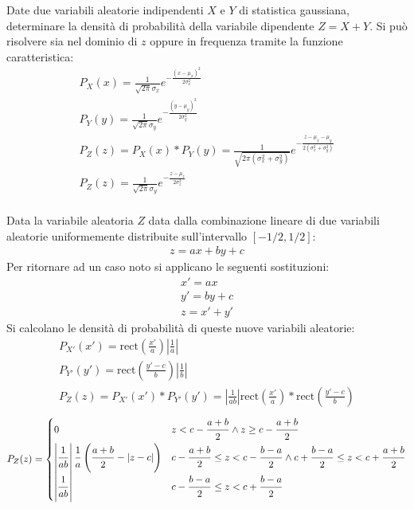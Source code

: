 \documentclass{article}
\newcommand{\rect}{\mbox{rect}}
\begin{document}
Date due variabili aleatorie indipendenti $X$ e $Y$ di statistica gaussiana, determinare la densità di probabilità della variabile dipendente $Z=X+Y$. 
Si può risolvere sia nel dominio di $z$ oppure in frequenza tramite la funzione caratteristica:
\begin{gather*}
    P_X(x)=\displaystyle\frac{1}{\sqrt{2\pi}\sigma_x}e^{-\frac{(x-\mu_x)^2}{2\sigma_x^2}}\\
    P_Y(y)=\displaystyle\frac{1}{\sqrt{2\pi}\sigma_y}e^{-\frac{(y-\mu_y)^2}{2\sigma_y^2}}\\
    P_Z(z)=P_X(x)*P_Y(y)=\displaystyle\frac{1}{\sqrt{2\pi(\sigma_x^2+\sigma_y^2)}}e^{-\frac{z-\mu_x-\mu_y}{2(\sigma_x^2+\sigma_y^2)}}\\
    P_Z(z)=\displaystyle\frac{1}{\sqrt{2\pi}\sigma_y}e^{-\frac{z-\mu_z}{2\sigma_z^2}}\\
\end{gather*} 


Data la variabile aleatoria $Z$ data dalla combinazione lineare di due variabili aleatorie uniformemente distribuite sull'intervallo $[-1/2,1/2]$:
\begin{gather*}
    z=ax+by+c
\end{gather*}
Per ritornare ad un caso noto si applicano le seguenti sostituzioni:
\begin{gather*}
    x'=ax\\
    y'=by+c\\
    z=x'+y'
\end{gather*}
Si calcolano le densità di probabilità di queste nuove variabili aleatorie:
\begin{gather*}
    P_{X'}(x')=\rect\displaystyle\left(\frac{x'}{a}\right)\left|\frac{1}{a}\right|\\
    P_{Y'}(y')=\rect\displaystyle\left(\frac{y'-c}{b}\right)\left|\frac{1}{b}\right|\\
    P_Z(z)=P_{X'}(x')*P_{Y'}(y')=\displaystyle\left|\frac{1}{ab}\right|\rect\left(\frac{x'}{a}\right)*\rect\left(\frac{y'-c}{b}\right)
\end{gather*}
\begin{equation}
    P_Z(z)=\begin{cases}
        0 &z<c-\displaystyle\frac{\strut a+b}{\strut 2} \land z\geq c-\frac{\strut a+b}{\strut 2}\\
        \displaystyle \left|\frac{\strut 1}{\strut ab}\right|\frac{\strut 1}{\strut a}\left(\frac{\strut a+b}{\strut 2}-|z-c|\right)&\displaystyle c-\frac{\strut a+b}{2}\leq z< c-\frac{\strut b-a}{\strut 2}\land c+\frac{\strut b-a}{\strut 2}\leq z<c+\frac{\strut a+b}{\strut 2}\\
        \displaystyle\left|\frac{\strut 1}{\strut ab}\right|&c-\displaystyle\frac{\strut b-a}{\strut 2}\leq z<c+\frac{\strut b-a}{\strut 2}
    \end{cases}
\end{equation}
\end{document}
